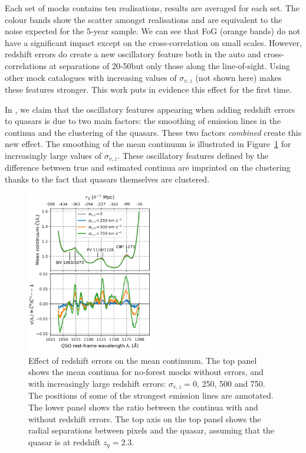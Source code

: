 Each set of mocks contains ten realisations, results are averaged for each set.
The colour bands show the scatter amongst realisations and are equivalent to the
noise expected for the 5-year sample. We can see that FoG (orange bands) do not 
have a significant impact except on the cross-correlation on small scales. 
However, redshift errors do create a new oscillatory feature both in the auto 
and cross-correlations at separations of 20-50\hmpc but only those along the 
line-of-sight. Using other mock catalogues with increasing values of 
$\sigma_{v, z}$ (not shown here) makes these features stronger. 
This work puts in evidence this effect for the first time. 

In \cite{youlesEffectQuasarRedshift2022}, we claim that the oscillatory
features appearing when adding redshift errors to quasars is due to 
two main factors: the smoothing of emission lines in the continua and 
the clustering of the quasars. These two factors \emph{combined} create this new 
effect. The smoothing of the mean continuum is illustrated in Figure~\ref{fig:zerrors_continua}
for increasingly large values of $\sigma_{v, z}$. These oscillatory features 
defined by the difference between true and estimated continua are imprinted 
on the clustering thanks to the fact that quasars themselves are clustered. 


\begin{figure}
    \centering 
    \includegraphics[width=0.5\textwidth]{fig/forests/zerros_impact_continua.png}
    \caption{Effect of redshift errors on the mean continuum. 
    The top panel shows the mean continua for no-forest mocks without errors, 
    and with increasingly large redshift errors: $\sigma_{v, z} = 0$, 250, 500 and 750\kms. 
    The positions of some of the strongest emission lines are annotated. 
    The lower panel shows the ratio between the continua with and without redshift errors. 
    The top axis on the top panel shows the radial separations between pixels and the quasar, 
    assuming that the quasar is at redshift $z_q = 2.3$.}
    \label{fig:zerrors_continua}
\end{figure}

